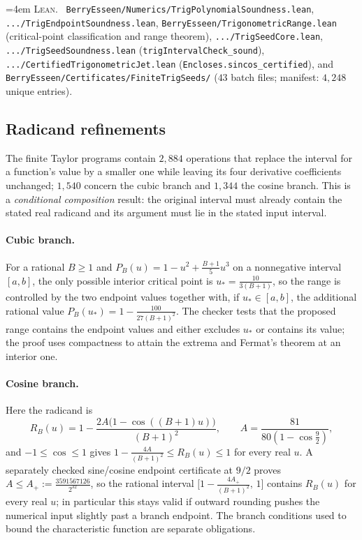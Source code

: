 \documentclass[10pt,a4paper]{article}
\theoremstyle{plain}
\theoremstyle{definition}
\newcommand{\lean}[1]{\texttt{#1}}
\newcommand{\file}[1]{\texttt{#1}}
\newenvironment{leanref}%
  {\par\addvspace{3pt}\begingroup\sloppy\emergencystretch=4em
   \noindent\footnotesize\textsc{Lean.}\ \ignorespaces}%
  {\par\endgroup\addvspace{3pt}}
\begin{document}
\begin{leanref}
\file{BerryEsseen/Numerics/TrigPolynomialSoundness.lean},
\file{.../TrigEndpointSoundness.lean},
\file{BerryEsseen/TrigonometricRange.lean} (critical-point classification and
range theorem), \file{.../TrigSeedCore.lean},
\file{.../TrigSeedSoundness.lean} (\lean{trigIntervalCheck\_sound}),
\file{.../CertifiedTrigonometricJet.lean} (\lean{Encloses.sincos\_certified}),
and \file{BerryEsseen/Certificates/FiniteTrigSeeds/} ($43$ batch files;
manifest: $4{,}248$ unique entries).
\end{leanref}

\subsection{Radicand refinements}

The finite Taylor programs contain $2{,}884$ operations that replace the
interval for a function's value by a smaller one while leaving its four
derivative coefficients unchanged; $1{,}540$ concern the cubic branch and
$1{,}344$ the cosine branch. This is a \emph{conditional composition} result:
the original interval must already contain the stated real radicand and its
argument must lie in the stated input interval.

\paragraph{Cubic branch.}
For a rational $B\ge1$ and $P_B(u)=1-u^2+\tfrac{B+1}{5}u^3$ on a nonnegative
interval $[a,b]$, the only possible interior critical point is
$u_*=\tfrac{10}{3(B+1)}$, so the range is controlled by the two endpoint values
together with, if $u_*\in[a,b]$, the additional rational value
$P_B(u_*)=1-\tfrac{100}{27(B+1)^2}$. The checker tests that the proposed range
contains the endpoint values and either excludes $u_*$ or contains its value;
the proof uses compactness to attain the extrema and Fermat's theorem at an
interior one.

\paragraph{Cosine branch.}
Here the radicand is
\[
  R_B(u) = 1-\frac{2A\bigl(1-\cos((B+1)u)\bigr)}{(B+1)^2},
  \qquad A = \frac{81}{80(1-\cos\tfrac92)} ,
\]
and $-1\le\cos\le1$ gives $1-\tfrac{4A}{(B+1)^2}\le R_B(u)\le1$ for every real
$u$. A separately checked sine/cosine endpoint certificate at $9/2$ proves
$A\le A_+:=\tfrac{3591567126}{2^{32}}$, so the rational interval
$\bigl[1-\tfrac{4A_+}{(B+1)^2},\,1\bigr]$ contains $R_B(u)$ for every real $u$;
in particular this stays valid if outward rounding pushes the numerical input
slightly past a branch endpoint. The branch conditions used to bound the
characteristic function are separate obligations.
\end{document}
